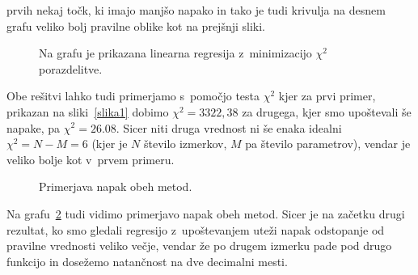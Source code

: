 \documentclass[a4paper,pdftex,12pt]{article}
\numberwithin{figure}{section} %
\begin{document}
prvih nekaj točk, ki imajo manjšo napako in tako je tudi krivulja na desnem grafu
veliko bolj pravilne oblike kot na prejšnji sliki. 
\begin{figure}    
    \resizebox{0.98\linewidth}{!}{}
    \caption{Na grafu je prikazana linearna regresija z~minimizacijo $\chi^2$ 
    porazdelitve.}
    \label{slika2}
\end{figure}
Obe rešitvi lahko tudi primerjamo s~pomočjo testa $\chi^2$ kjer za prvi primer, prikazan
na sliki~\ref{slika1} dobimo $\chi^2=3322,38$ za drugega, kjer smo upoštevali še napake,
pa $\chi^2=26.08$. Sicer niti druga vrednost ni še enaka idealni $\chi^2 = N-M=6$ (kjer
je $N$ število izmerkov, $M$ pa število parametrov), vendar je veliko bolje kot v~prvem
primeru.
\begin{figure}    
    \resizebox{0.98\linewidth}{!}{}
    \caption{Primerjava napak obeh metod.}
    \label{slika3}
\end{figure}
Na grafu~\ref{slika3} tudi vidimo primerjavo napak obeh metod. Sicer je na začetku 
drugi rezultat, ko smo gledali regresijo z~upoštevanjem uteži napak odstopanje od pravilne
vrednosti veliko večje, vendar že po drugem izmerku pade pod drugo funkcijo in dosežemo
natančnost na dve decimalni mesti.

\end{document}
